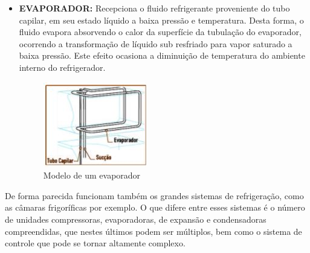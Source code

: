 \begin{itemize}
		\item  \textbf{EVAPORADOR:} Recepciona o fluido refrigerante proveniente do tubo capilar, em seu estado líquido a baixa pressão e temperatura. Desta forma, o fluido evapora absorvendo o calor da superfície da tubulação do evaporador, ocorrendo a transformação de líquido sub resfriado para vapor saturado a baixa pressão. Este efeito ocasiona a diminuição de temperatura do ambiente interno do refrigerador.
					\begin{figure}[H]
						\begin{center}
							\includegraphics[scale=1]{figuras/evaporador}
							\caption{Modelo de um evaporador}
						\end{center}
					\end{figure}
					
			\end{itemize}
	
		De forma parecida funcionam também os grandes sistemas de refrigeração, como as câmaras frigoríficas por exemplo. O que difere entre esses sistemas é o número de unidades compressoras, evaporadoras, de expansão e condensadoras compreendidas, que nestes últimos podem ser múltiplos, bem como o sistema de controle que pode se tornar altamente complexo.
	